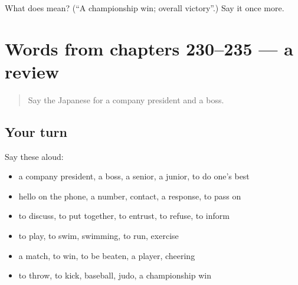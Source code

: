\begin{tcolorbox}[breakable,colback=teal!4,colframe=teal!35!black,title={Before you move on}]
What does  mean? (\textquotedblleft{}A championship win; overall victory\textquotedblright{}.) Say it once more.
\end{tcolorbox}
\section[(dialogue)]{Words from chapters 230–235 — a review}

\label{lesson:JA-R235-review-230-235}



\begin{quote}
Say the Japanese for a company president and a boss.
\end{quote}

\subsection*{Your turn}
Say these aloud:

\begin{itemize}
\raggedright
  \item a company president, a boss, a senior, a junior, to do one's best
  \item hello on the phone, a number, contact, a response, to pass on
  \item to discuss, to put together, to entrust, to refuse, to inform
  \item to play, to swim, swimming, to run, exercise
  \item a match, to win, to be beaten, a player, cheering
  \item to throw, to kick, baseball, judo, a championship win
\end{itemize}

